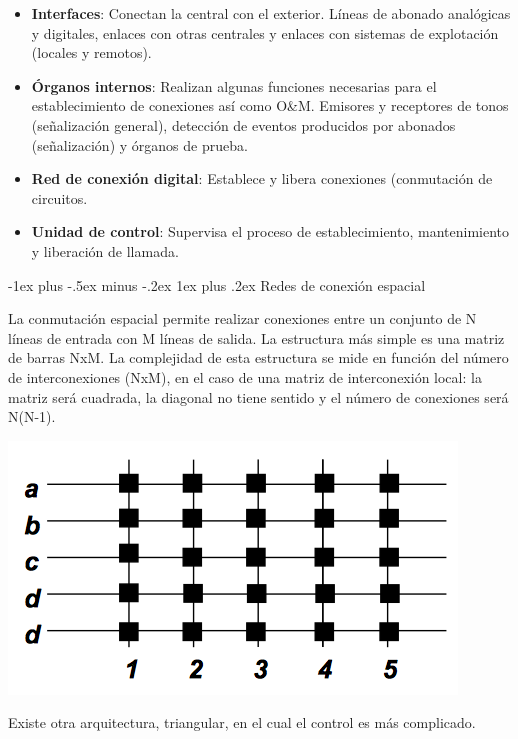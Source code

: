 \documentclass[10pt,portrait, twocolumn]{article}
\makeatletter
\renewcommand{\subsubsection}{\@startsection{subsubsection}{3}{0mm}%
                                {-1ex plus -.5ex minus -.2ex}%
                                {1ex plus .2ex}%
                                {\normalfont\small\bfseries}}
\makeatother
\begin{document}
	\begin{itemize}
		\item \textbf{Interfaces}: Conectan la central con el exterior. Líneas de abonado analógicas y digitales, enlaces con otras centrales y enlaces con sistemas de explotación (locales y remotos).
		\item \textbf{Órganos internos}: Realizan algunas funciones necesarias para el establecimiento de conexiones así como O\&M. Emisores y receptores de tonos (señalización general), detección de eventos producidos por abonados (señalización) y órganos de prueba.
		\item \textbf{Red de conexión digital}: Establece y libera conexiones (conmutación de circuitos.
		\item \textbf{Unidad de control}: Supervisa el proceso de establecimiento, mantenimiento y liberación de llamada.
	\end{itemize}
	
\subsubsection{Redes de conexión espacial}

La conmutación espacial permite realizar conexiones entre un conjunto de N líneas de entrada con M líneas de salida. La estructura más simple es una matriz de barras NxM. La complejidad de esta estructura se mide en función del número de interconexiones (NxM), en el caso de una matriz de interconexión local: la matriz será cuadrada, la diagonal no tiene sentido y el número de conexiones será N(N-1).

	\begin{center}
		\includegraphics[scale = 0.3]{barras}
	\end{center}
	
Existe otra arquitectura, triangular, en el cual el control es más complicado.
\end{document}
